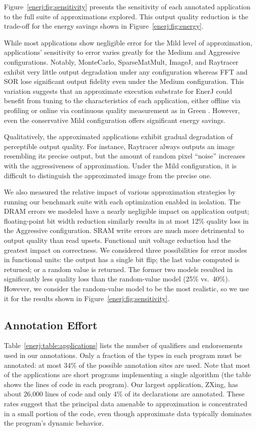 Figure~\ref{enerj:fig:sensitivity} presents the sensitivity of each
annotated application to the full suite of approximations
explored. This output quality reduction is the trade-off for the
energy savings shown in Figure~\ref{enerj:fig:energy}.

While most applications show negligible error for the Mild level of
approximation, applications' sensitivity to error varies greatly for the Medium
and Aggressive configurations. Notably, MonteCarlo, SparseMatMult, ImageJ, and
Raytracer exhibit
very little output degradation under any configuration whereas FFT and SOR lose
significant output fidelity even under the Medium configuration.
This variation suggests that an approximate execution substrate for EnerJ
could benefit from tuning to the characteristics of each application,
either offline via profiling or online via continuous quality measurement
as in Green \cite{green}.
However, even the
conservative Mild configuration offers significant energy savings.

Qualitatively, the approximated applications exhibit gradual degradation of
perceptible output quality. For instance, Raytracer always outputs an image
resembling its precise output, but the amount of random pixel ``noise''
increases with the aggressiveness of approximation. Under the Mild
configuration, it is difficult to distinguish the approximated image from the
precise one.

We also measured the relative impact of various approximation
strategies by running our benchmark suite with each optimization enabled in
isolation. The DRAM errors we modeled have a nearly negligible impact on application output;
floating-point bit width reduction similarly results in at most 12\% quality loss
in the Aggressive configuration. SRAM write errors are much more detrimental to
output quality than read upsets. Functional unit voltage reduction had the
greatest impact on correctness. We considered three possibilities for error
modes in
functional units: the output has a single bit flip; the last value computed is
returned; or a random value is returned. The former two models resulted in
significantly less quality loss than the random-value model (25\% vs.~40\%).
However, we consider the random-value model to be the most realistic, so we use it for
the results shown in Figure~\ref{enerj:fig:sensitivity}.

\subsection{Annotation Effort}
\label{enerj:effort}
Table~\ref{enerj:table:applications} lists the number of qualifiers and
endorsements used in our annotations.
Only a fraction of the types in each program must be annotated: at most 34\% of
the possible annotation sites are used.
Note that most of the applications are short programs implementing a
single algorithm (the table shows the lines of code in
each program). Our largest application, ZXing, has about 26,000 lines
of code and only 4\% of its declarations are annotated.
These rates suggest that the principal data
amenable to approximation is concentrated in a small portion of the code,
even though approximate data typically dominates the program's dynamic behavior.

